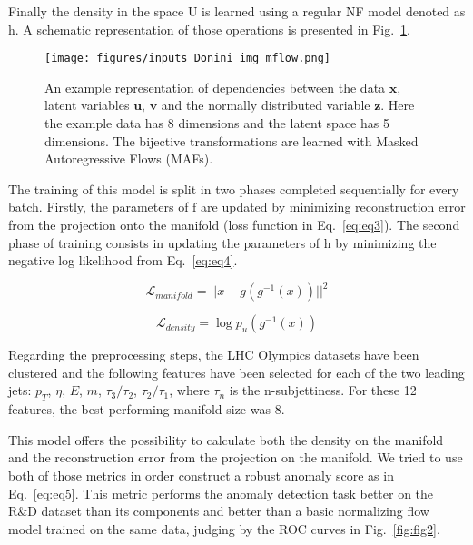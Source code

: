 \documentclass[a4paper,11pt]{article}
\begin{document}
Finally the density in the space $\mathrm{U}$ is learned using a regular NF model denoted as $\mathrm{h}$. A schematic representation of those operations is presented in Fig.~\ref{fig:fig1}.

\begin{figure}[h!]
    \centering
    \texttt{[image: figures/inputs\_Donini\_img\_mflow.png]}
    \caption{An  example representation of dependencies between the data $\mathbf{x}$, latent variables $\mathbf{u}$, $\mathbf{v}$ and the normally distributed variable $\mathbf{z}$. Here the example data has 8 dimensions and the latent space has 5 dimensions. The bijective transformations are learned with Masked Autoregressive Flows (MAFs).}
    \label{fig:fig1}
\end{figure}

The training of this model is split in two phases completed sequentially for every batch. Firstly, the parameters of $ \mathrm{f}$ are updated by minimizing reconstruction error from the projection onto the manifold (loss function in Eq.~\ref{eq:eq3}). The second phase of training consists in updating the parameters of $\mathrm{h}$ by minimizing the negative log likelihood from Eq.~\ref{eq:eq4}. 

\begin{equation}
    \mathcal{L}_{manifold} = \lvert \lvert x-g(g^{-1}(x)) \lvert \lvert ^2
    \label{eq:eq3}
\end{equation}

\begin{equation}
    \mathcal{L}_{density} = \log p_{u}(g^{-1}(x))
    \label{eq:eq4}
\end{equation}

Regarding the preprocessing steps, the LHC Olympics datasets have been clustered and the following features have been selected for each of the two leading jets: $p_T$, $\eta$, $E$, $m$, $\tau_3/\tau_2$, $\tau_2/\tau_1$, where $\tau_n$ is the n-subjettiness. For these 12 features, the best performing manifold size was 8.

This model offers the possibility to calculate both the density on the manifold and the reconstruction error from the projection on the manifold. We tried to use both of those metrics in order construct a robust anomaly score as in Eq.~\ref{eq:eq5}. This metric performs the anomaly detection task better on the R\&D dataset than its components and better than a basic normalizing flow model trained on the same data, judging by the ROC curves in Fig.~\ref{fig:fig2}.
\end{document}
